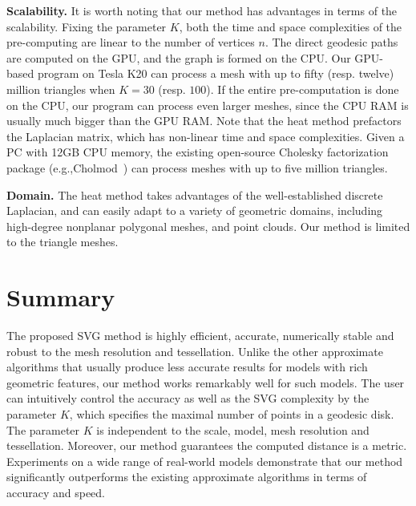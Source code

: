 \noindent\textbf{Scalability.} It is worth noting that our method
has advantages in terms of the scalability. Fixing the parameter
$K$, both the time and space complexities of the pre-computing are
linear to the number of vertices $n$. The direct geodesic paths are
computed on the GPU, and the graph is formed on the CPU. Our
GPU-based program on Tesla K20 can process a mesh with up to fifty
(resp. twelve) million triangles when $K=30$ (resp. $100$). If the
entire pre-computation is done on the CPU, our program can process
even larger meshes, since the CPU RAM is usually much bigger than
the GPU RAM. Note that the heat method prefactors the Laplacian
matrix, which has non-linear time and space complexities. Given a PC
with 12GB CPU memory, the existing open-source Cholesky
factorization package
(e.g.,Cholmod~\cite{Davis:2009:DSS:1462173.1462176}) can process
meshes with up to five million triangles.

\noindent\textbf{Domain.} The heat method takes advantages of the
well-established discrete Laplacian, and can easily adapt to a
variety of geometric domains, including high-degree nonplanar
polygonal meshes, and point clouds. Our method is limited to the
triangle meshes.

\section{Summary}\label{sec:summary}

The proposed SVG method is highly efficient, accurate, numerically
stable and robust to the mesh resolution and tessellation. Unlike
the other approximate algorithms that usually produce less accurate
results for models with rich geometric features, our method works
remarkably well for such models. The user can intuitively control
the accuracy as well as the SVG complexity by the parameter $K$,
which specifies the maximal number of points in a geodesic disk. The
parameter $K$ is independent to the scale, model, mesh resolution
and tessellation. Moreover, our method guarantees the computed
distance is a metric. Experiments on a wide range of real-world
models demonstrate that our method significantly outperforms the
existing approximate algorithms in terms of accuracy and speed.

